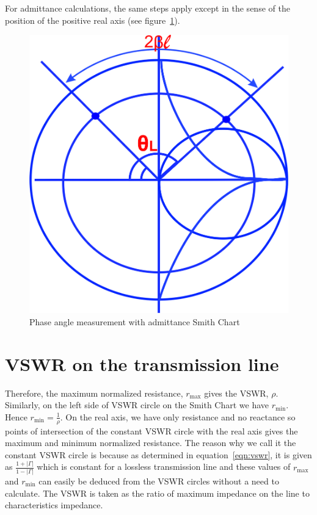 For admittance calculations, the same steps apply except in the sense of the position of the positive real axis (see figure~\ref{fig:dfyui}).
\begin{figure}[h]
\centering
\includegraphics[width=0.7\linewidth]{./graphics/dfyui}
\caption{Phase angle measurement with admittance Smith Chart}
\label{fig:dfyui}
\end{figure}


\section{VSWR on the transmission line}
Therefore, the maximum normalized resistance, $r_\max$ gives the VSWR, $\rho$. Similarly, on the left side of VSWR circle on the Smith Chart we have $r_\min$. Hence $r_\min = \frac{1}{\rho}$. On the real axis, we have only resistance and no reactance so points of intersection of the constant VSWR circle with the real axis gives the maximum and minimum normalized resistance.  The reason why we call it the constant VSWR circle is because as determined in equation~\eqref{eqn:vswr}, it is given as $\frac{1 + |\Gamma|}{1 - |\Gamma|}$ which is constant for a lossless transmission line and these values of $r_\max$ and $r_\min$ can easily be deduced from the VSWR circles without a need to calculate. The VSWR is taken as the ratio of maximum impedance on the line to characteristics impedance.


